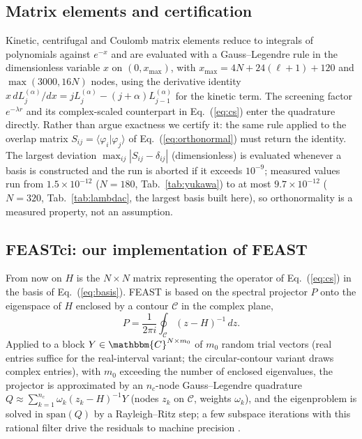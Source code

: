 \documentclass[12pt,twoside]{paper}
\newcommand{\complexset}{\mathbbm{C}}}
\newcommand{\complexset}{\mathbb{C}}}
\begin{document}
\subsection{Matrix elements and certification}
\label{sec:elements}

Kinetic, centrifugal and Coulomb matrix elements reduce to integrals of
polynomials against $e^{-x}$ and are evaluated with a Gauss--Legendre rule
in the dimensionless variable $x$ on $(0, x_{\max})$, with
$x_{\max} = 4N + 24(\ell+1) + 120$ and $\max(3000, 16N)$ nodes, using the
derivative identity
$x\,dL_j^{(\alpha)}/dx = jL_j^{(\alpha)} - (j+\alpha)L_{j-1}^{(\alpha)}$
for the kinetic term. The screening factor $e^{-\lambda r}$ and its
complex-scaled counterpart in Eq.~(\ref{eq:cs}) enter the quadrature
directly. Rather than argue exactness we certify it: the same rule applied
to the overlap matrix $S_{ij}=\langle\varphi_i|\varphi_j\rangle$ of
Eq.~(\ref{eq:orthonormal}) must return the identity. The largest deviation
$\max_{ij}|S_{ij}-\delta_{ij}|$ (dimensionless) is evaluated whenever a
basis is constructed and the run is aborted if it exceeds $10^{-9}$;
measured values run from $1.5\times10^{-12}$ ($N=180$,
Tab.~\ref{tab:yukawa}) to at most $9.7\times10^{-12}$ ($N=320$,
Tab.~\ref{tab:lambdac}, the largest basis built here), so orthonormality
is a measured property, not an assumption.

\subsection{FEASTci: our implementation of FEAST}
\label{sec:feast}

From now on $H$ is the $N \times N$ matrix representing the operator of
Eq.~(\ref{eq:cs}) in the basis of Eq.~(\ref{eq:basis}). FEAST is based on
the spectral projector $P$ onto the eigenspace of $H$ enclosed by a
contour $\mathcal{C}$ in the complex plane,
\begin{equation}
P = \frac{1}{2\pi i}\oint_{\mathcal{C}} (z - H)^{-1}\, dz .
\label{eq:projector}
\end{equation}
Applied to a block $Y \in \complexset^{N \times m_0}$ of $m_0$ random trial
vectors (real entries suffice for the real-interval variant; the
circular-contour variant draws complex entries), with $m_0$ exceeding the
number of enclosed eigenvalues, the projector is approximated by an
$n_c$-node Gauss--Legendre quadrature
$Q \approx \displaystyle\sum_{k=1}^{n_c} \omega_k (z_k - H)^{-1} Y$
(nodes $z_k$ on
$\mathcal{C}$, weights $\omega_k$), and the eigenproblem is solved in
$\mathrm{span}(Q)$ by a Rayleigh--Ritz step; a few subspace iterations
with this rational filter drive the residuals to machine precision
\cite{Polizzi2009}.
\end{document}
